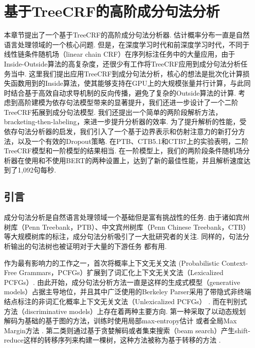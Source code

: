 \chapter{基于TreeCRF的高阶成分句法分析}
\label{cha:con-crf}

本章节提出了一个基于TreeCRF的高阶成分句法分析器.
估计概率分布一直是自然语言处理领域的一个核心问题.
但是，在深度学习时代和前深度学习时代，不同于线性链条件随机场（linear chain CRF）在序列标注任务中的大量应用，由于Inside-Outside算法的高复杂度，还很少有工作将TreeCRF应用到成分句法分析任务当中.
这里我们提出应用TreeCRF到成分句法分析，核心的想法是批次化计算损失函数用到的Inside算法，使其能够支持在GPU上的大规模张量并行计算，与此同时结合基于高效自动求导机制的反向传播，避免了复杂的Outside算法的计算.
考虑到高阶建模为依存句法模型带来的显著提升，我们还进一步设计了一个二阶TreeCRF拓展到成分句法模型.
我们还提出一个简单的两阶段解析方法，bracketing-then-labeling，来进一步提升分析器的效率.
为了提升解析的性能，受依存句法分析器的启发，我们引入了一个基于边界表示和仿射注意力的新打分方法，以及一个有效的Dropout策略.
在PTB、CTB5.1和CTB7上的实验表明，二阶TreeCRF模型和一阶模型的结果相当.
在一阶模型上，我们的两阶段条件随机场分析器在使用和不使用BERT的两种设置上，达到了新的最佳性能，并且解析速度达到了1,092句每秒.

\section{引言}\label{sec:con-intro}

成分句法分析是自然语言处理领域一个基础但是富有挑战性的任务.
由于诸如宾州树库（Penn Treebank，PTB）、中文宾州树库（Penn Chinese Treebank，CTB）等大规模树库的标注，成分句法分析吸引了一大批研究者的关注.
同样的，句法分析输出的句法树也被证明对于大量的下游任务 \citep{akoury-etal-2019-syntactically,wang-etal-2018-tree}都有用.

作为最有影响力的工作之一，\citet{collins-1997-three}首次将概率上下文无关文法 (Probabilistic Context-Free Grammars，PCFGs）扩展到了词汇化上下文无关文法（Lexicalized PCFGs）.
由此开始，成分句法分析方法一直是这样的生成式模型（generative models）占据主导地位，并且其中广泛使用的Berkeley Parser采用了带隐式非终端结点标注的非词汇化概率上下文无关文法（Unlexicalized PCFGs） \citep{matsuzaki-etal-2005-probabilistic,petrov-klein-2007-improved}.
而在判别式方法（discriminative models）上存在着两种主要方向.
第一种采取了以动态规划解码为基础的基于图的方法，训练时使用局部max-entropy估计 \citep{kaplan-etal-2004-speed}或者全局Max Margin方法 \citep{taskar-etal-2004-max}.
第二类则通过基于贪婪解码或者集束搜索（beam search）产生shift-reduce这样的转移序列来构建一棵树，这种方法被称为基于转移的方法 \citep{sagae-lavie-2005-classifier,zhu-etal-2013-fast}.

